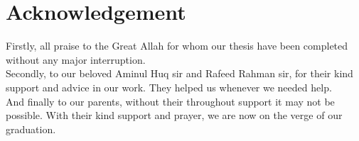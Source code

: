 \section*{Acknowledgement}
Firstly, all praise to the Great Allah for whom our thesis have been completed without any major interruption.\\
Secondly, to our beloved Aminul Huq sir and Rafeed Rahman sir, for their kind support and advice in our work. They helped us whenever we needed help.\\
And finally to our parents, without their throughout support it may not be possible. With their kind support and prayer, we are now on the verge of our graduation.